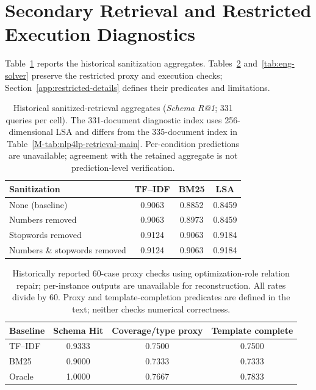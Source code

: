\documentclass[pdflatex,sn-basic,Numbered]{sn-jnl}
\begin{document}
\section{Secondary Retrieval and Restricted Execution Diagnostics}
Table~\ref{tab:nlp4lp-overlap} reports the historical sanitization aggregates. Tables~\ref{tab:eng-structural} and~\ref{tab:eng-solver} preserve the restricted proxy and execution checks; Section~\ref{app:restricted-details} defines their predicates and limitations.
\begin{table}[htbp]
\centering
\caption{Historical sanitized-retrieval aggregates (\textit{Schema R@1}; 331 queries per cell). The 331-document diagnostic index uses 256-dimensional LSA and differs from the 335-document index in Table~\ref{M-tab:nlp4lp-retrieval-main}. Per-condition predictions are unavailable; agreement with the retained aggregate is not prediction-level verification.}
\label{tab:nlp4lp-overlap}
\small
\begin{tabular}{lccc}
  \toprule
  Sanitization & TF--IDF & BM25 & LSA \\
  \midrule
  None (baseline)               & 0.9063 & 0.8852 & 0.8459 \\
  Numbers removed               & 0.9063 & 0.8973 & 0.8459 \\
  Stopwords removed             & 0.9124 & 0.9063 & 0.9184 \\
  Numbers \& stopwords removed  & 0.9124 & 0.9063 & 0.9184 \\
  \bottomrule
\end{tabular}
\end{table}
\begin{table}[htbp]
\centering
\caption{Historically reported 60-case proxy checks using optimization-role relation repair; per-instance outputs are unavailable for reconstruction. All rates divide by 60. Proxy and template-completion predicates are defined in the text; neither checks numerical correctness.}
\label{tab:eng-structural}
\small
\begin{tabular}{lccc}
  \toprule
  Baseline & Schema Hit & Coverage/type proxy & Template complete \\
  \midrule
  TF--IDF & 0.9333 & 0.7500 & 0.7500 \\
  BM25    & 0.9000 & 0.7333 & 0.7333 \\
  Oracle  & 1.0000 & 0.7667 & 0.7833 \\
  \bottomrule
\end{tabular}
\end{table}
\end{document}
